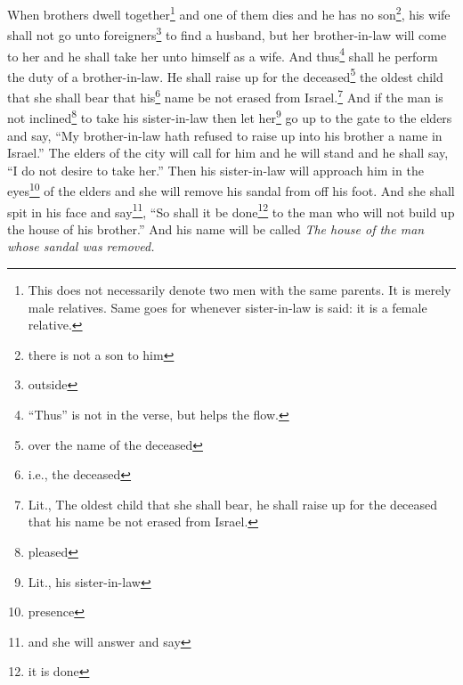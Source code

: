 \begin{enumerate}[align=center]
     When brothers dwell together\footnote{This does not necessarily denote two men with the same parents. It is merely male relatives. Same goes for whenever sister-in-law is said: it is a female relative.} and one of them dies and he has no son\footnote{there is not a son to him}, his wife shall not go unto foreigners\footnote{outside} to find a husband, but her brother-in-law will come to her and he shall take her unto himself as a wife. And thus\footnote{``Thus'' is not in the verse, but helps the flow.} shall he perform the duty of a brother-in-law.%
     He shall raise up for the deceased\footnote{over the name of the deceased} the oldest child that she shall bear that his\footnote{i.e., the deceased} name be not erased from Israel.\footnote{Lit., The oldest child that she shall bear, he shall raise up for the deceased that his name be not erased from Israel.}%
     And if the man is not inclined\footnote{pleased} to take his sister-in-law then let her\footnote{Lit., his sister-in-law} go up to the gate to the elders and say, ``My brother-in-law hath refused to raise up into his brother a name in Israel.''%
     The elders of the city will call for him and he will stand and he shall say, ``I do not desire to take her.''%
     Then his sister-in-law will approach him in the eyes\footnote{presence} of the elders and she will remove his sandal from off his foot. And she shall spit in his face and say\footnote{and she will answer and say}, ``So shall it be done\footnote{it is done} to the man who will not build up the house of his brother.''%
     And his name will be called \textit{The house of the man whose sandal was removed.}%
\end{enumerate}
